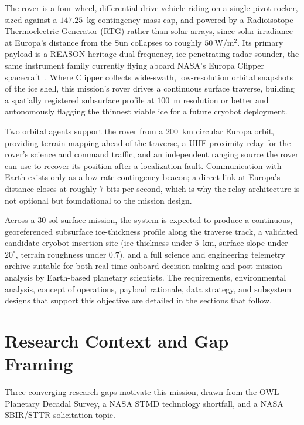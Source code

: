 \documentclass[11pt]{article}
\begin{document}
The rover is a four-wheel, differential-drive vehicle riding on a single-pivot rocker, sized
against a $147.25$~kg contingency mass cap, and powered by a Radioisotope Thermoelectric
Generator (RTG) rather than solar arrays, since solar irradiance at Europa's distance from the
Sun collapses to roughly $50\ \mathrm{W/m^2}$. Its primary payload is a REASON-heritage
dual-frequency, ice-penetrating radar sounder, the same instrument family currently flying
aboard NASA's Europa Clipper spacecraft~\cite{reason}. Where Clipper collects wide-swath,
low-resolution orbital snapshots of the ice shell, this mission's rover drives a continuous
surface traverse, building a spatially registered subsurface profile at $100$~m resolution or
better and autonomously flagging the thinnest viable ice for a future cryobot deployment.

Two orbital agents support the rover from a $200$~km circular Europa orbit, providing terrain
mapping ahead of the traverse, a UHF proximity relay for the rover's science and command
traffic, and an independent ranging source the rover can use to recover its position after a
localization fault. Communication with Earth exists only as a low-rate contingency beacon; a
direct link at Europa's distance closes at roughly $7$ bits per second, which is why the relay
architecture is not optional but foundational to the mission design.

Across a 30-sol surface mission, the system is expected to produce a continuous, georeferenced
subsurface ice-thickness profile along the traverse track, a validated candidate cryobot
insertion site (ice thickness under $5$~km, surface slope under $20^\circ$, terrain roughness
under $0.7$), and a full science and engineering telemetry archive suitable for both real-time
onboard decision-making and post-mission analysis by Earth-based planetary scientists. The
requirements, environmental analysis, concept of operations, payload rationale, data strategy,
and subsystem designs that support this objective are detailed in the sections that follow.

\section{Research Context and Gap Framing}

Three converging research gaps motivate this mission, drawn from the OWL Planetary Decadal
Survey, a NASA STMD technology shortfall, and a NASA SBIR/STTR solicitation topic.
\end{document}
